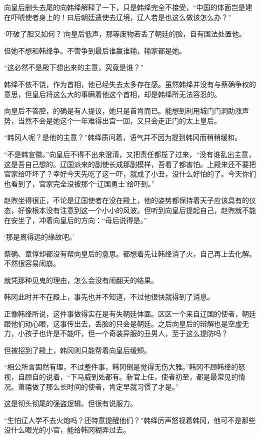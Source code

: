 向皇后删头去尾的向韩绛解释了一下，只是韩绛完全不接受，“中国的体面岂是建在吓唬使者身上的！曰后朝廷遣使去辽境，辽人若是也这么做该怎么办？”

‘吓破了胆又如何？’向皇后低声，那等废物若丢了朝廷的脸，自有国法处置他。

但她不想和韩绛争。不管争到最后谁赢谁输，输家都是她。

“这必然不是殿下想出来的主意，究竟是谁？”

韩绛不依不饶，作为首相，他已经失去太多存在感。虽然韩绛并没有与蔡确争权的意思，但皇后将这么大的事瞒着他这个首相，却是韩绛所无法容忍的。

向皇后不答腔，的确是有人提议，她只是首肯而已。能想到利用城门门洞助涨声势，当然不会是她这个一年难得出宫一回，又只会走正门的太上皇后。

“韩冈人呢？是他的主意？”韩绛质问着，语气并不因为提到韩冈而稍稍缓和。

“不是韩宣徽。”向皇后不得不出来澄清，又把责任都揽了过来，“没有谁乱出主意，这是吾自己想的。辽国派来的副使长成那副模样，吾看了都害怕。上殿来还不要把官家给吓坏了？幸好今天先吃了这一吓，就成了小丑，没什么好怕的了。今天你们也看到了，官家完全没被那个‘辽国勇士’给吓到。”

赵煦坐得很正，不论是辽国使者在没在殿上，他的姿势都保持着天子应该具有的仪态，好像根本没有注意到这一个小小的风波。但听到向皇后提起自己，赵煦就不能在安坐了，冲着向皇后的方向：“母后说得是。”

‘那是离得远的缘故吧。’

蔡确、章惇却都没有帮向皇后的意思。都想着先让韩绛消了火，自己再上去化解。不然很容易闹崩。

就凭那种见鬼的理由，怎么会没有闹翻天的结果。

韩冈此时并不在殿上，事先也并不知道，不过他很快就得到了消息。

正像韩绛所说，这件事做得实在是有失朝廷体面。区区一个来自辽国的使者，朝廷跟他们动心眼，这事传出去，丢脸的只会是朝廷。之后向皇后的辩解也是空虚无力，小孩子也许是不能吓，但一个奇装异服的丑男人，至于这么提防吗？

但被招到了殿上，韩冈则只能帮着向皇后缓颊。

“相公所言固然有理，不过整件事，韩冈倒是觉得无伤大雅。”韩冈不顾韩绛的怒视，自顾自的说着，“下马威到处都有。新官上任，使者初至，都是最常见的情况。萧禧做了那么长时间的使者，肯定早就习惯了才是。”

这是彻头彻尾的强盗逻辑。但很有说服力。

“生怕辽人学不去火炮吗？还特意提醒他们？”韩绛厉声怒视着韩冈，他可不是那些没什么眼光的小官，能给韩冈糊弄过去。

